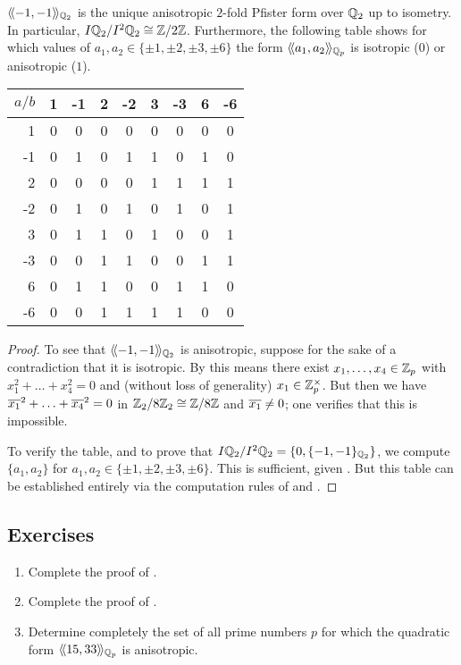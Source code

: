 \documentclass[12pt, leqno, british]{amsart}
\begin{document}
\begin{prop}\label{P:2-fold-Pfister-qq2}
$\langle\!\langle -1, -1 \rangle\!\rangle_{\mathbb Q_2}$ is the unique anisotropic $2$-fold Pfister form over $\mathbb Q_2$ up to isometry.
In particular, $I\mathbb Q_2/I^2\mathbb Q_2 \cong \mathbb Z/2\mathbb Z$.
Furthermore, the following table shows for which values of $a_1, a_2 \in \lbrace \pm 1, \pm 2, \pm 3, \pm 6 \rbrace$ the form $\langle\!\langle a_1, a_2 \rangle\!\rangle_{\mathbb Q_p}$ is isotropic ($0$) or anisotropic ($1$).

\centering
\begin{tabular}{r | c c c c c c c c}
$a/b$ & 1 & -1 & 2 & -2 & 3 & -3 & 6 & -6 \\ \hline
1 & 0 & 0 & 0 & 0 & 0 & 0 & 0 & 0 \\
-1 & 0 & 1 & 0 & 1 & 1& 0 & 1 & 0 \\
2 & 0 & 0 & 0 & 0 & 1 & 1 & 1 & 1 \\
-2 & 0 & 1 & 0 & 1 & 0 & 1 & 0 & 1 \\
3 & 0 & 1 & 1 & 0 & 1 & 0 & 0 & 1\\
-3 & 0 & 0 & 1 & 1 & 0 & 0 & 1 & 1 \\
6 & 0 & 1 & 1 & 0 & 0 & 1 & 1 & 0 \\
-6 & 0 & 0 & 1 & 1 & 1 & 1 & 0 & 0
\end{tabular}
\end{prop}
\begin{proof}
To see that $\langle\!\langle -1, -1 \rangle\!\rangle_{\mathbb Q_2}$ is anisotropic, suppose for the sake of a contradiction that it is isotropic.
By  this means there exist $x_1, \ldots, x_4 \in \mathbb Z_p$ with $x_1^2 + \ldots + x_4^2 = 0$ and (without loss of generality) $x_1 \in \mathbb Z_p^\times$.
But then we have $\overline{x_1}^2 + \ldots + \overline{x_4}^2 = 0$ in $\mathbb Z_2/8\mathbb Z_2 \cong \mathbb Z/8\mathbb Z$ and $\overline{x_1} \neq 0$; one verifies that this is impossible.

To verify the table, and to prove that $I\mathbb Q_2/I^2\mathbb Q_2 = \lbrace 0, \lbrace -1, -1 \rbrace_{\mathbb Q_2} \rbrace$, we compute $\lbrace a_1, a_2 \rbrace$ for $a_1, a_2 \in \lbrace \pm 1, \pm 2, \pm 3, \pm 6 \rbrace$. This is sufficient, given .
But this table can be established entirely via the computation rules of  and .
\end{proof}

\subsection{Exercises}
\begin{enumerate}
\item Complete the proof of .
\item Complete the proof of .
\item Determine completely the set of all prime numbers $p$ for which the quadratic form $\langle\!\langle 15, 33 \rangle\!\rangle_{\mathbb Q_p}$ is anisotropic.
\end{enumerate}
\end{document}
